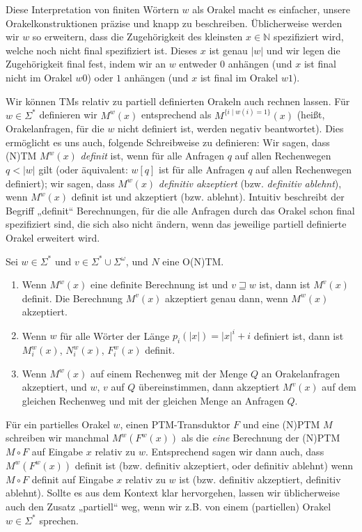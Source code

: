 Diese Interpretation von finiten Wörtern $w$ als Orakel macht es einfacher, unsere Orakelkonstruktionen präzise und knapp zu beschreiben. Üblicherweise werden wir $w$ so erweitern, dass die Zugehörigkeit des kleinsten $x\in\mathbb N$ spezifiziert wird, welche noch nicht final spezifiziert ist. Dieses $x$ ist genau $|w|$ und wir legen die Zugehörigkeit final fest, indem wir an $w$ entweder $0$ anhängen (und $x$ ist final nicht im Orakel $w0$) oder $1$ anhängen (und $x$ ist final im Orakel $w1$).


Wir können TMs relativ zu partiell definierten Orakeln auch rechnen lassen. Für $w\in\Sigma^*$ definieren wir $M^w(x)$ entsprechend als $M^{\{i\mid w(i)=1\}}(x)$ (heißt, Orakelanfragen, für die $w$ nicht definiert ist, werden negativ beantwortet).
Dies ermöglicht es uns auch, folgende Schreibweise zu definieren: Wir sagen, dass (N)TM $M^w(x)$ \emph{definit} ist, wenn für alle Anfragen $q$ auf allen Rechenwegen $q<|w|$ gilt (oder äquivalent: $w[q]$ ist für alle Anfragen $q$ auf allen Rechenwegen definiert); wir sagen, dass $M^w(x)$ \emph{definitiv akzeptiert} (bzw. \emph{definitiv ablehnt}), wenn $M^w(x)$ definit ist und akzeptiert (bzw. ablehnt). Intuitiv beschreibt der Begriff „definit“ Berechnungen, für die alle Anfragen durch das Orakel schon final spezifiziert sind, die sich also nicht ändern, wenn das jeweilige partiell definierte Orakel erweitert wird.

\begin{observation}\label{obs:partialoracles}
    Sei $w\in\Sigma^*$ und $v\in\Sigma^*\cup\Sigma^\omega$, und $N$ eine O(N)TM.
    \begin{enumerate}[midpenalty=0]
        \item Wenn $M^w(x)$ eine definite Berechnung ist und $v\sqsupseteq w$ ist, dann ist $M^v(x)$ definit. Die Berechnung $M^v(x)$ akzeptiert genau dann, wenn $M^w(x)$ akzeptiert.
        \item Wenn $w$ für alle Wörter der Länge $p_i(|x|)=|x|^i+i$ definiert ist, dann ist $M_i^w(x)$, $N_i^w(x)$, $F_i^w(x)$ definit.
        \item Wenn $M^w(x)$ auf einem Rechenweg mit der Menge $Q$ an Orakelanfragen akzeptiert, und $w$, $v$ auf $Q$ übereinstimmen, dann akzeptiert $M^v(x)$ auf dem gleichen Rechenweg und mit der gleichen Menge an Anfragen $Q$.
    \end{enumerate}
\end{observation}

Für ein partielles Orakel $w$, einen PTM-Transduktor $F$ und eine (N)PTM $M$ schreiben wir manchmal $M^w(F^w(x))$ als die \emph{eine} Berechnung der (N)PTM $M\circ F$ auf Eingabe $x$ relativ zu $w$.
Entsprechend sagen wir dann auch, dass $M^w(F^w(x))$ definit ist (bzw. definitiv akzeptiert, oder definitiv ablehnt) wenn $M\circ F$ definit auf Eingabe $x$ relativ zu $w$ ist (bzw. definitiv akzeptiert, definitiv ablehnt).
Sollte es aus dem Kontext klar hervorgehen, lassen wir üblicherweise auch den Zusatz „partiell“ weg, wenn wir z.B. von einem (partiellen) Orakel $w\in\Sigma^*$ sprechen.

